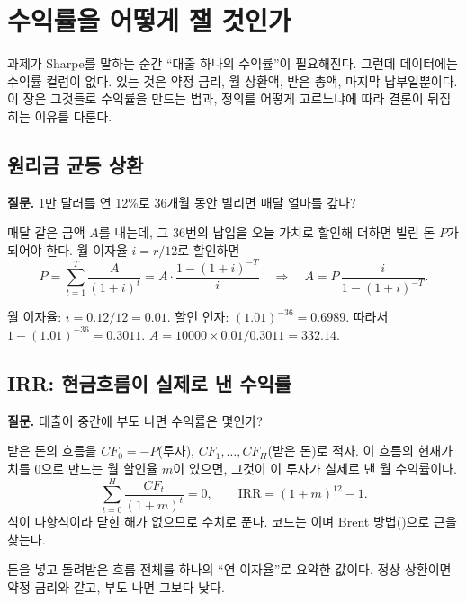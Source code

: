 \chapter{수익률을 어떻게 잴 것인가}

과제가 Sharpe를 말하는 순간 ``대출 하나의 수익률''이 필요해진다. 그런데 데이터에는 수익률 컬럼이 없다. 있는 것은 약정 금리, 월 상환액, 받은 총액, 마지막 납부일뿐이다. 이 장은 그것들로 수익률을 만드는 법과, 정의를 어떻게 고르느냐에 따라 결론이 뒤집히는 이유를 다룬다.

\section{원리금 균등 상환}
\textbf{질문.} 1만 달러를 연 12\%로 36개월 동안 빌리면 매달 얼마를 갚나?

매달 같은 금액 $A$를 내는데, 그 36번의 납입을 오늘 가치로 할인해 더하면 빌린 돈 $P$가 되어야 한다. 월 이자율 $i=r/12$로 할인하면
\[
P=\sum_{t=1}^{T}\frac{A}{(1+i)^t}=A\cdot\frac{1-(1+i)^{-T}}{i}
\quad\Longrightarrow\quad
A=P\,\frac{i}{1-(1+i)^{-T}}.
\]

\begin{workout}[월 상환액]
 월 이자율: $i=0.12/12=0.01$. 
 할인 인자: $(1.01)^{-36}=0.6989$. 따라서 $1-(1.01)^{-36}=0.3011$.
 $A=10000\times 0.01/0.3011=332.14$. 
\end{workout}

\section{IRR: 현금흐름이 실제로 낸 수익률}
\textbf{질문.} 대출이 중간에 부도 나면 수익률은 몇인가?

받은 돈의 흐름을 $CF_0=-P$(투자), $CF_1,\dots,CF_H$(받은 돈)로 적자. 이 흐름의 현재가치를 0으로 만드는 월 할인율 $m$이 있으면, 그것이 이 투자가 실제로 낸 월 수익률이다.
\[
\sum_{t=0}^{H}\frac{CF_t}{(1+m)^t}=0,\qquad \mathrm{IRR}=(1+m)^{12}-1.
\]
식이 다항식이라 닫힌 해가 없으므로 수치로 푼다. 코드는 이며 Brent 방법()으로 근을 찾는다.

\begin{keybox}[IRR]
돈을 넣고 돌려받은 흐름 전체를 하나의 ``연 이자율''로 요약한 값이다. 정상 상환이면 약정 금리와 같고, 부도 나면 그보다 낮다.
\end{keybox}

